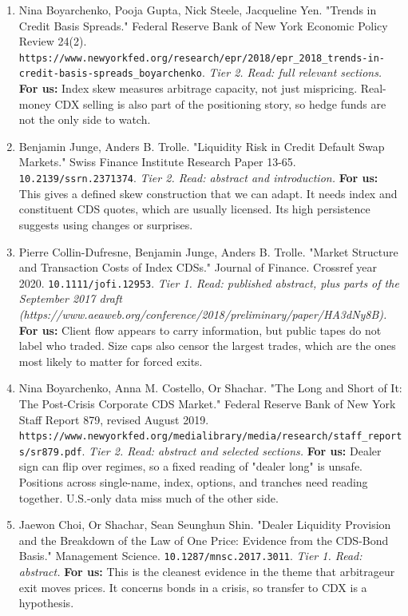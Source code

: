 \begin{enumerate}[leftmargin=*,itemsep=3pt]
\item Nina Boyarchenko, Pooja Gupta, Nick Steele, Jacqueline Yen. "Trends in Credit Basis Spreads." Federal Reserve Bank of New York Economic Policy Review 24(2). \nolinkurl{https://www.newyorkfed.org/research/epr/2018/epr\_2018\_trends-in-credit-basis-spreads\_boyarchenko}. \emph{Tier 2. Read: full relevant sections.} \textbf{For us:} Index skew measures arbitrage capacity, not just mispricing. Real-money CDX selling is also part of the positioning story, so hedge funds are not the only side to watch.
\item Benjamin Junge, Anders B. Trolle. "Liquidity Risk in Credit Default Swap Markets." Swiss Finance Institute Research Paper 13-65. \nolinkurl{10.2139/ssrn.2371374}. \emph{Tier 2. Read: abstract and introduction.} \textbf{For us:} This gives a defined skew construction that we can adapt. It needs index and constituent CDS quotes, which are usually licensed. Its high persistence suggests using changes or surprises.
\item Pierre Collin-Dufresne, Benjamin Junge, Anders B. Trolle. "Market Structure and Transaction Costs of Index CDSs." Journal of Finance. Crossref year 2020. \nolinkurl{10.1111/jofi.12953}. \emph{Tier 1. Read: published abstract, plus parts of the September 2017 draft (https://www.aeaweb.org/conference/2018/preliminary/paper/HA3dNy8B).} \textbf{For us:} Client flow appears to carry information, but public tapes do not label who traded. Size caps also censor the largest trades, which are the ones most likely to matter for forced exits.
\item Nina Boyarchenko, Anna M. Costello, Or Shachar. "The Long and Short of It: The Post-Crisis Corporate CDS Market." Federal Reserve Bank of New York Staff Report 879, revised August 2019. \nolinkurl{https://www.newyorkfed.org/medialibrary/media/research/staff\_reports/sr879.pdf}. \emph{Tier 2. Read: abstract and selected sections.} \textbf{For us:} Dealer sign can flip over regimes, so a fixed reading of "dealer long" is unsafe. Positions across single-name, index, options, and tranches need reading together. U.S.-only data miss much of the other side.
\item Jaewon Choi, Or Shachar, Sean Seunghun Shin. "Dealer Liquidity Provision and the Breakdown of the Law of One Price: Evidence from the CDS-Bond Basis." Management Science. \nolinkurl{10.1287/mnsc.2017.3011}. \emph{Tier 1. Read: abstract.} \textbf{For us:} This is the cleanest evidence in the theme that arbitrageur exit moves prices. It concerns bonds in a crisis, so transfer to CDX is a hypothesis.

\end{enumerate}
